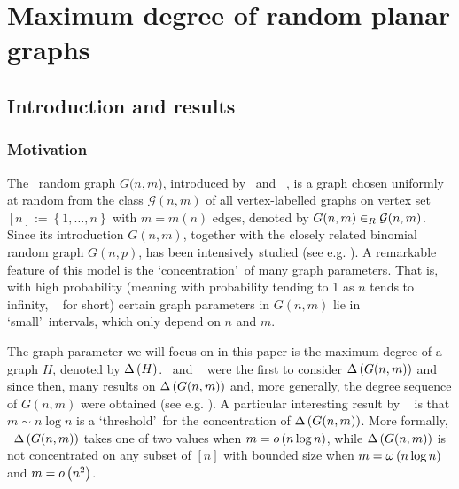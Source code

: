
\def\seq{\mathbf{a}} %
\def\property{\mathcal{R}}
\renewcommand{\Rest}{R}
\renewcommand{\rest}[1]{R\left(#1\right)} %

\chapter{Maximum degree of random planar graphs}\label{cha:max_degree}

\section{Introduction and results}\label{MDsec:intro}

\subsection{Motivation}\label{MDsubsec:motivation}
The \ER\ random graph $G(n,m$), introduced by \Erdos\ and \Renyi\ \cite{ErdoesRenyi1959,ErdoesRenyi1960}, is a graph chosen uniformly at random from the class $\mathcal{G}(n,m)$ of all vertex-labelled graphs on vertex set $[n]:=\left\{1, \ldots, n\right\}$ with $m=m(n)$ edges, denoted by $G(n,m)\in_R \mathcal{G}(n,m)$. Since its introduction $G(n,m)$, together with the closely related binomial random graph $G(n,p)$, has been intensively studied (see e.g. \cite{FriezeKaronski2016, JansonLuczakRucinski2000, Bollobas2001}). A remarkable feature of this model is the \lq concentration\rq\ of many graph parameters. That is, with high probability (meaning with probability tending to 1 as $n$ tends to infinity, {\em \whp\ } for short) certain graph parameters in $G(n,m)$ lie in \lq small\rq\ intervals, which only depend on $n$ and $m$.

The graph parameter we will focus on in this paper is the maximum degree of a graph $H$, denoted by $\Delta\left(H\right)$. \Erdos\ and \Renyi\ \cite{ErdoesRenyi1959} were the first to consider $\Delta\left(G(n,m)\right)$ and since then, many results on $\Delta\left(G(n,m)\right)$ and, more generally, the degree sequence of $G(n,m)$ were obtained (see e.g. \cite{Bollobas1980b,RiordanSelby2000,ErdosWilson1977,Bollobas1981,McKayWormald1997,Ivcenko1973,Bollobas1982}). A particular interesting result by \Bollobas\ \cite{Bollobas1982} is that $m\sim n\log n$ is a \lq threshold\rq\ for the concentration of $\Delta\left(G(n,m)\right)$. More formally, \whp\ $\Delta\left(G(n,m)\right)$ takes one of two values when $m=o\left(n \log n\right)$, while $\Delta\left(G(n,m)\right)$ is not concentrated on any subset of $[n]$ with bounded size when $m=\omega\left(n \log n\right)$ and $m=o\left(n^2\right)$.

